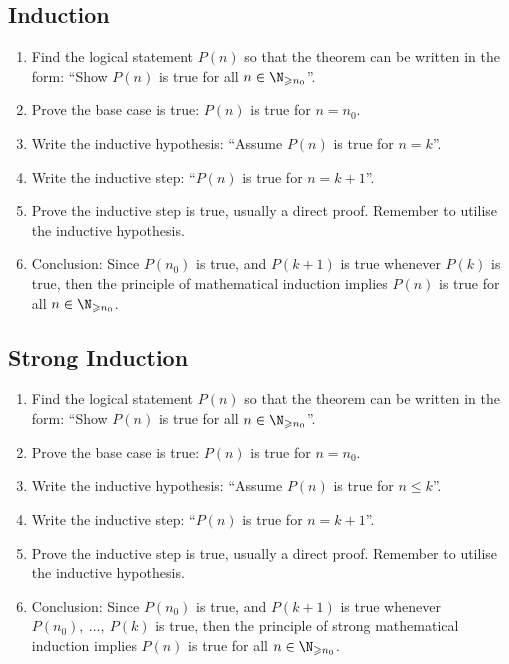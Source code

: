 \documentclass{article}
\begin{document}
\subsection{Induction}
\begin{enumerate}
    \item Find the logical statement \(P(n)\) so that the theorem can be written in the form: ``Show \(P(n)\) is true for all \(n \in \N_{\geqslant n_0}\)''.
    \item Prove the base case is true: \(P(n)\) is true for \(n=n_0\).
    \item Write the inductive hypothesis: ``Assume \(P(n)\) is true for \(n=k\)''.
    \item Write the inductive step: ``\(P(n)\) is true for \(n=k+1\)''.
    \item Prove the inductive step is true, usually a direct proof. Remember to utilise the inductive hypothesis.
    \item Conclusion: Since \(P(n_0)\) is true, and \(P(k+1)\) is true whenever \(P(k)\) is true, then the principle of mathematical induction implies \(P(n)\) is true for all \(n\in \N_{\geqslant n_0}\).
\end{enumerate}
%
\subsection{Strong Induction}
\begin{enumerate}
    \item Find the logical statement \(P(n)\) so that the theorem can be written in the form: ``Show \(P(n)\) is true for all \(n \in \N_{\geqslant n_0}\)''.
    \item Prove the base case is true: \(P(n)\) is true for \(n=n_0\).
    \item Write the inductive hypothesis: ``Assume \(P(n)\) is true for \(n\leqslant k\)''.
    \item Write the inductive step: ``\(P(n)\) is true for \(n=k+1\)''.
    \item Prove the inductive step is true, usually a direct proof. Remember to utilise the inductive hypothesis.
    \item Conclusion: Since \(P(n_0)\) is true, and \(P(k+1)\) is true whenever \(P(n_0),\: \ldots,\: P(k)\) is true, then the principle of strong mathematical induction implies \(P(n)\) is true for all \(n\in \N_{\geqslant n_0}\).
\end{enumerate}
%
\pagebreak
\end{document}
